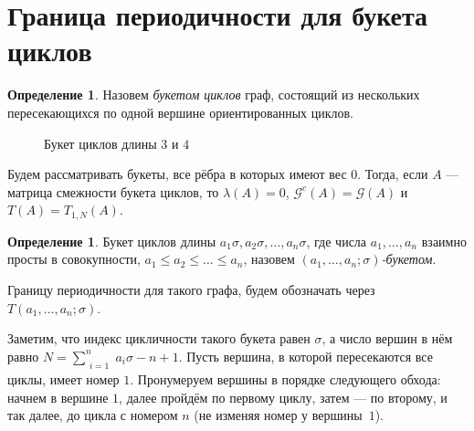 \documentclass[12pt]{article}
\theoremstyle{definition}
\newtheorem{definition}[theorem]{Определение}
\begin{document}
\section{Граница периодичности для букета циклов}
\label{wedge}
\begin{definition} Назовем \textit{букетом циклов} граф, состоящий из нескольких пересекающихся по одной вершине ориентированных циклов.
\end{definition}

\begin{figure}[t]
\centering
{}
\caption{Букет циклов длины $3$ и $4$}
\end{figure}

Будем рассматривать букеты, все рёбра в которых имеют вес $0$. Тогда, если $A$ --- матрица смежности букета циклов, то $\lambda(A) = 0$, $\mathcal{G}^c(A) = \mathcal{G}(A)$ и $T(A) = T_{1, N}(A)$.

\begin{definition}
Букет циклов длины $a_1\sigma, a_2\sigma, \dots, a_n\sigma$, где числа $a_1, \dots, a_n$ взаимно просты в совокупности, $a_1\le a_2 \le \dots \le a_n$, назовем \textit{$(a_1, \dots, a_n; \sigma)$-букетом}.

Границу периодичности для такого графа, будем обозначать через $T(a_1, \dots, a_n; \sigma)$.
\end{definition}

Заметим, что индекс цикличности такого букета равен $\sigma$, а число вершин в нём равно $N = \sum\limits_{\substack{i=1}}^n a_i\sigma - n + 1$. Пусть вершина, в которой пересекаются все циклы, имеет номер $1$. Пронумеруем вершины в порядке следующего обхода: начнем в вершине $1$, далее пройдём по первому циклу, затем --- по второму, и так далее, до цикла с номером $n$ (не изменяя номер у вершины~$1$).
\end{document}
